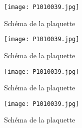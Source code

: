 

\begin{figure}[ht!]
    \centering
    \texttt{[image: P1010039.jpg]}
    \caption{Schéma de la plaquette}
    \label{plaquette}
\end{figure}
\begin{figure}[ht!]
    \centering
    \texttt{[image: P1010039.jpg]}
    \caption{Schéma de la plaquette}
    \label{plaquette}
\end{figure}
\begin{figure}[ht!]
    \centering
    \texttt{[image: P1010039.jpg]}
    \caption{Schéma de la plaquette}
    \label{plaquette}
\end{figure}
\begin{figure}[ht!]
    \centering
    \texttt{[image: P1010039.jpg]}
    \caption{Schéma de la plaquette}
    \label{plaquette}
\end{figure}
